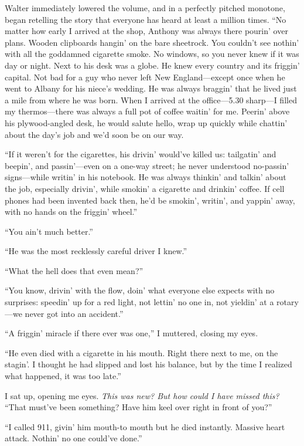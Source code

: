 Walter immediately lowered the volume, and in a perfectly pitched
monotone, began retelling the story that everyone has heard at least a
million times. ``No matter how early I arrived at the shop, Anthony was
always there pourin' over plans. Wooden clipboards hangin' on the bare
sheetrock. You couldn't see nothin' with all the goddamned cigarette
smoke. No windows, so you never knew if it was day or night. Next to his
desk was a globe. He knew every country and its friggin' capital. Not
bad for a guy who never left New England---except once when he went to
Albany for his niece's wedding. He was always braggin' that he lived
just a mile from where he was born. When I arrived at the office---5.30
sharp---I filled my thermos---there was always a full pot of coffee
waitin' for me. Peerin' above his plywood-angled desk, he would salute
hello, wrap up quickly while chattin' about the day's job and we'd soon
be on our way.

``If it weren't for the cigarettes, his drivin' would've killed us:
tailgatin' and beepin', and passin'---even on a one-way street; he never
understood no-passin' signs---while writin' in his notebook. He was
always thinkin' and talkin' about the job, especially drivin', while
smokin' a cigarette and drinkin' coffee. If cell phones had been
invented back then, he'd be smokin', writin', and yappin' away, with no
hands on the friggin' wheel.''

``You ain't much better.''

``He was the most recklessly careful driver I knew.''

``What the hell does that even mean?''

``You know, drivin' with the flow, doin' what everyone else expects with
no surprises: speedin' up for a red light, not lettin' no one in, not
yieldin' at a rotary---we never got into an accident.''

``A friggin' miracle if there ever was one,'' I muttered, closing my
eyes.

``He even died with a cigarette in his mouth. Right there next to me, on
the stagin'. I thought he had slipped and lost his balance, but by the
time I realized what happened, it was too late.''

I sat up, opening me eyes. \emph{This was new? But how could I have
missed this?} ``That must've been something? Have him keel over right in
front of you?''

``I called 911, givin' him mouth-to mouth but he died instantly. Massive
heart attack. Nothin' no one could've done.''

